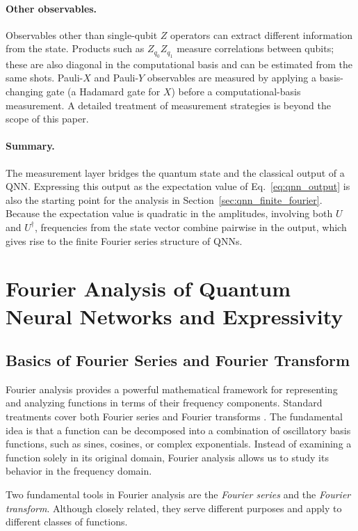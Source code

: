 \documentclass[12pt]{article}
\numberwithin{equation}{section}  %
\begin{document}
\paragraph{Other observables.} Observables other than single-qubit $Z$ operators can extract different information from the state. Products such as $Z_{q_0} Z_{q_1}$ measure correlations between qubits; these are also diagonal in the computational basis and can be estimated from the same shots. Pauli-$X$ and Pauli-$Y$ observables are measured by applying a basis-changing gate (a Hadamard gate for $X$) before a computational-basis measurement. A detailed treatment of measurement strategies is beyond the scope of this paper.

\paragraph{Summary.} The measurement layer bridges the quantum state and the classical output of a QNN. Expressing this output as the expectation value of Eq.~\eqref{eq:qnn_output} is also the starting point for the analysis in Section~\ref{sec:qnn_finite_fourier}. Because the expectation value is quadratic in the amplitudes, involving both $U$ and $U^{\dagger}$, frequencies from the state vector combine pairwise in the output, which gives rise to the finite Fourier series structure of QNNs.


\section{Fourier Analysis of Quantum Neural Networks and Expressivity}
\label{sec:qnn_fourier}

\subsection{Basics of Fourier Series and Fourier Transform}
Fourier analysis provides a powerful mathematical framework for representing and analyzing functions in terms of their frequency components. Standard treatments cover both Fourier series and Fourier transforms \cite{stein2003fourier}. The fundamental idea is that a function can be decomposed into a combination of oscillatory basis functions, such as sines, cosines, or complex exponentials. Instead of examining a function solely in its original domain, Fourier analysis allows us to study its behavior in the frequency domain.

Two fundamental tools in Fourier analysis are the \textit{Fourier series} and the \textit{Fourier transform}. Although closely related, they serve different purposes and apply to different classes of functions.
\end{document}

